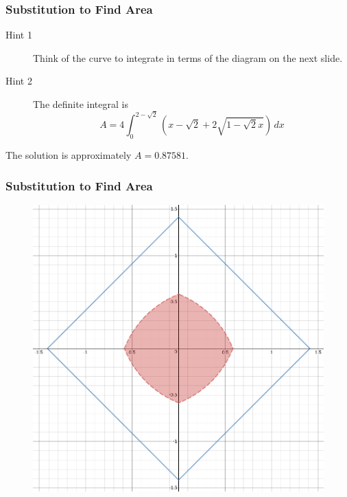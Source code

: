 \documentclass[xcolor=dvipsnames]{beamer}
\begin{document}
\begin{frame}
  \frametitle{Substitution to Find Area}
  \begin{description}
  \item[Hint 1] Think of the curve to integrate in terms of the
    diagram on the next slide.
  \item[Hint 2] The definite integral is
    \begin{equation}
      \label{eq:loocooch}
      A=4\int_{0}^{2-\sqrt{2}}\left(x-\sqrt{2}+2\sqrt{1-\sqrt{2}x}\right)\,dx
    \end{equation}
  \end{description}
  The solution is approximately $A=0.87581$.
\end{frame}

\begin{frame}
  \frametitle{Substitution to Find Area}
  \begin{figure}[h]
    \includegraphics[scale=0.3]{./diagrams/squarish-desmos.png}
  \end{figure}
\end{frame}
\end{document}
